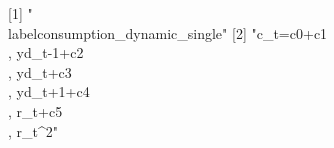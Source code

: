 [1] "\\label{consumption_dynamic_single}"                                                                    
[2] "{c_{t}}={c0}+{c1}\\, {yd_{t-1}}+{c2}\\, {yd_{t}}+{c3}\\, {yd_{t+1}}+{c4}\\, {r_{t}}+{c5}\\, {r_{t}}^{2}"
